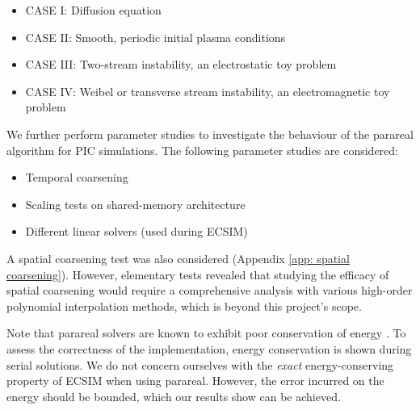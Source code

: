 \begin{itemize}

    \item CASE I: Diffusion equation

    \item CASE II: Smooth, periodic initial plasma conditions

    \item CASE III: Two-stream instability, an electrostatic toy problem

    \item CASE IV: Weibel or transverse stream instability, an electromagnetic toy problem
    \end{itemize}
 We further perform parameter studies to investigate the behaviour of the parareal algorithm for PIC simulations. The following parameter studies are considered: 
 \begin{itemize}
 
    \item Temporal coarsening
    
    \item Scaling tests on shared-memory architecture
    
    \item Different linear solvers (used during ECSIM)
 
 \end{itemize}
A spatial coarsening test was also considered (Appendix \ref{app: spatial coarsening}). However, elementary tests revealed that studying the efficacy of spatial coarsening would require a comprehensive analysis with various high-order polynomial interpolation methods, which is beyond this project's scope. 

Note that parareal solvers are known to exhibit poor conservation of energy \cite{gander_analysis_2014}. To assess the correctness of the implementation, energy conservation is shown during serial solutions. We do not concern ourselves with the \textit{exact} energy-conserving property of ECSIM when using parareal. However, the error incurred on the energy should be bounded, which our results show can be achieved.



